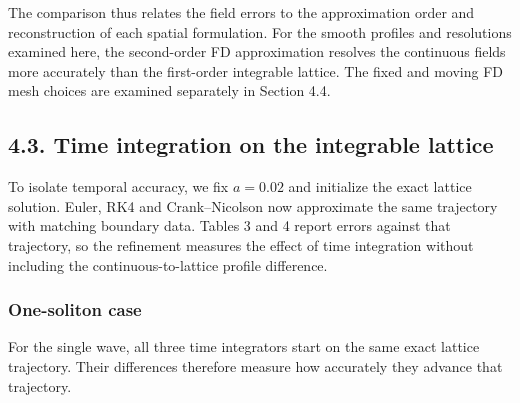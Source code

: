 \documentclass[11pt,a4paper]{article}
\begin{document}
The comparison thus relates the field errors to the approximation order and reconstruction of each spatial formulation. For the smooth profiles and resolutions examined here, the second-order FD approximation resolves the continuous fields more accurately than the first-order integrable lattice. The fixed and moving FD mesh choices are examined separately in Section 4.4.

\FloatBarrier
\subsection*{4.3. Time integration on the integrable lattice}

To isolate temporal accuracy, we fix \(a=0.02\) and initialize the exact lattice solution. Euler, RK4 and Crank–Nicolson now approximate the same trajectory with matching boundary data. Tables 3 and 4 report errors against that trajectory, so the refinement measures the effect of time integration without including the continuous-to-lattice profile difference.

\subsubsection*{One-soliton case}

For the single wave, all three time integrators start on the same exact lattice trajectory. Their differences therefore measure how accurately they advance that trajectory.
\end{document}
